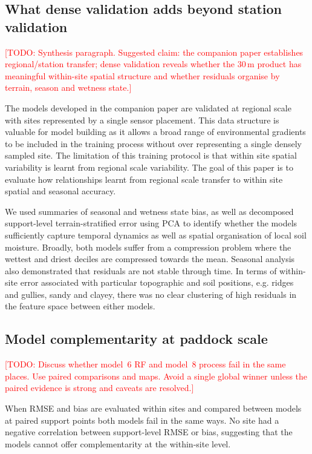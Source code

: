 \documentclass[11pt,a4paper]{article}
\newcommand{\modelSix}{model~6 RF}
\newcommand{\modelEight}{model~8 process}
\newcommand{\todo}[1]{\textcolor{red}{[TODO: #1]}}
\begin{document}
\subsection{What dense validation adds beyond station validation}
\label{sec:dense-adds}

\todo{Synthesis paragraph.  Suggested claim: the companion paper establishes
regional/station transfer; dense validation reveals whether the 30\,m product
has meaningful within-site spatial structure and whether residuals organise by
terrain, season and wetness state.}

The models developed in the companion paper are validated at regional scale with sites 
represented by a single sensor placement. This data structure is valuable for model building
as it allows a broad range of environmental gradients to be included in the training process
without over representing a single densely sampled site. The limitation of this training
protocol is that within site spatial variability is learnt from regional scale variability.
The goal of this paper is to evaluate how relationships learnt from regional scale transfer to 
within site spatial and seasonal accuracy. 

We used summaries of seasonal and wetness state bias, 
as well as decomposed support-level terrain-stratified error using PCA to identify whether the models
sufficiently capture temporal dynamics as well as spatial organisation of local soil moisture. 
Broadly, both models suffer from a compression problem where the wettest and driest deciles are compressed
towards the mean. Seasonal analysis also demonstrated that residuals are not stable through time. 
In terms of within-site error associated with particular topographic and soil positions, e.g. ridges and gullies, 
sandy and clayey, there was no clear clustering of high residuals in the feature space between either models. 


\subsection{Model complementarity at paddock scale}
\label{sec:model-complementarity}

\todo{Discuss whether \modelSix{} and \modelEight{} fail in the same places.
Use paired comparisons and maps.  Avoid a single global winner unless the
paired evidence is strong and caveats are resolved.}

When RMSE and bias are evaluated within sites and compared between models at paired support 
points both models fail in the same ways. No site had a negative correlation between support-level
RMSE or bias, suggesting that the models cannot offer complementarity at the within-site level. 
\end{document}
